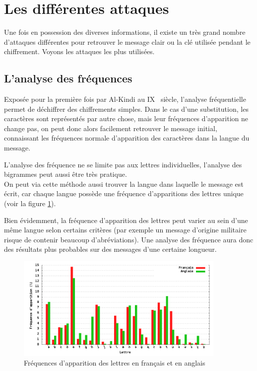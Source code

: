 \section{Les différentes attaques}
Une fois en possession des diverses informations, il existe un
très grand nombre d'attaques différentes pour retrouver le message
clair ou la clé utilisée pendant le chiffrement. Voyons les
attaques les plus utilisées.

\subsection{L'analyse des fréquences\label{sec:AnalyseFrequences}}
Exposée pour la première fois par Al-Kindi au IX\ieme~ siècle,
l'analyse fréquentielle permet de déchiffrer des chiffrements
simples. Dans le cas d'une substitution, les
caractères sont représentés par autre chose, mais leur fréquences
d'apparition ne change pas, on peut donc alors facilement
retrouver le message initial, connaissant les fréquences
normale d'apparition des caractères dans la langue du message.

L'analyse des fréquence ne se limite pas aux lettres
individuelles, l'analyse des bigrammes peut aussi être très
pratique.
\\

On peut via cette méthode aussi trouver la langue dans laquelle le
message est écrit, car chaque langue possède une fréquence
d'apparitions des lettres unique (voir la figure \ref{fig:Frequences}).

Bien évidemment, la fréquence d'apparition des lettres peut varier
au sein d'une même langue selon certains critères (par exemple un
message d'origine militaire risque de contenir beaucoup
d'abréviations). Une analyse des fréquence aura donc des résultats
plus probables sur des messages d'une certaine longueur.

\begin{figure}[h]
  \centering
    \includegraphics[width=0.9\textwidth]{plot/Frequences.png}
    \caption{Fréquences d'apparition des lettres en français et en
anglais}
  \label{fig:Frequences}
\end{figure}


